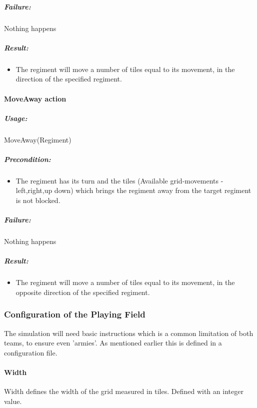 		\subparagraph{Failure:} 
		Nothing happens \\
		
		\subparagraph{Result:}
		\begin{itemize}\itemsep0.0001cm
		\item The regiment will move a number of tiles equal to its movement, in the direction of the specified regiment.
		\end{itemize}
		
		\paragraph{MoveAway action}
		\subparagraph{Usage:} 
		MoveAway(Regiment) \\
		
		\subparagraph{Precondition:} 
		\begin{itemize}\itemsep0.0001cm
		\item The regiment has its turn and the tiles (Available grid-movements - left,right,up down)
		which brings the regiment away from the target regiment is not blocked.
		\end{itemize}
		
		\subparagraph{Failure:} 
		Nothing happens
		
		\subparagraph{Result:}
		\begin{itemize}\itemsep0.0001cm
			\item The regiment will move a number of tiles equal to its movement, in the opposite direction of the specified regiment.
		\end{itemize}
				
		\subsubsection{Configuration of the Playing Field}
		The simulation will need basic instructions which is a common limitation of both teams, to ensure even 'armies'. 
		As mentioned earlier this is defined in a configuration file.
		
		\paragraph{Width}
		Width defines the width of the grid measured in tiles.
		Defined with an integer value.
		
